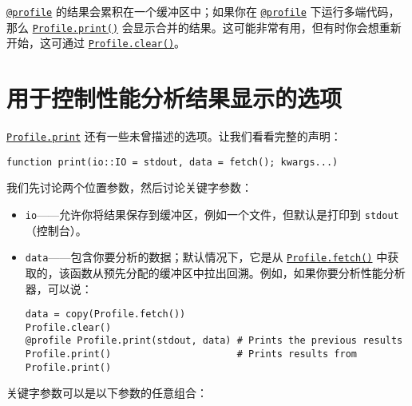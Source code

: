 \hyperlink{9691715859147716436}{\texttt{@profile}} 的结果会累积在一个缓冲区中；如果你在 \hyperlink{9691715859147716436}{\texttt{@profile}} 下运行多端代码，那么 \hyperlink{2955792207246042270}{\texttt{Profile.print()}} 会显示合并的结果。这可能非常有用，但有时你会想重新开始，这可通过 \hyperlink{15414823368700214048}{\texttt{Profile.clear()}}。



\hypertarget{3561003529463300631}{}


\section{用于控制性能分析结果显示的选项}



\hyperlink{2955792207246042270}{\texttt{Profile.print}} 还有一些未曾描述的选项。让我们看看完整的声明：




\begin{verbatim}
function print(io::IO = stdout, data = fetch(); kwargs...)
\end{verbatim}



我们先讨论两个位置参数，然后讨论关键字参数：



\begin{itemize}
\item \texttt{io}——允许你将结果保存到缓冲区，例如一个文件，但默认是打印到 \texttt{stdout}（控制台）。


\item \texttt{data}——包含你要分析的数据；默认情况下，它是从 \hyperlink{3578108280181558112}{\texttt{Profile.fetch()}} 中获取的，该函数从预先分配的缓冲区中拉出回溯。例如，如果你要分析性能分析器，可以说：


\begin{verbatim}
data = copy(Profile.fetch())
Profile.clear()
@profile Profile.print(stdout, data) # Prints the previous results
Profile.print()                      # Prints results from Profile.print()
\end{verbatim}

\end{itemize}


关键字参数可以是以下参数的任意组合：



